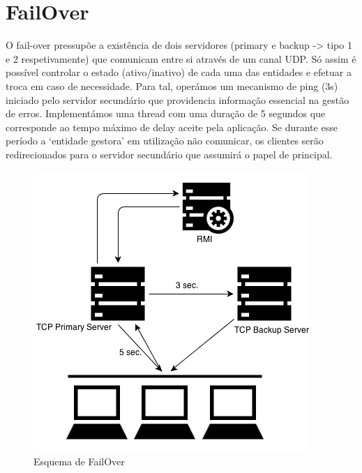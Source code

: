 \documentclass[12pt]{article} %
\begin{document}
\pagebreak

\section{FailOver}
\label{sec:failover}
O fail-over pressupõe a existência de dois servidores (primary e backup -> tipo 1 e 2 respetivamente) que comunicam entre si através de um canal UDP. Só assim é possível controlar o estado (ativo/inativo) de cada uma das entidades e efetuar a troca em caso de necessidade. Para tal, operámos um mecanismo de ping (3s) iniciado pelo servidor secundário que providencia informação essencial na gestão de erros. 
Implementámos uma thread com uma duração de 5 segundos que corresponde ao tempo máximo de delay aceite pela aplicação. Se durante esse período a ‘entidade gestora’ em utilização não comunicar, os clientes serão redirecionados para o servidor secundário que assumirá o papel de principal.

\begin{figure}[!ht]
	\centering
		\includegraphics[scale=0.6]{failover.png}
	\caption{Esquema de FailOver}
	\label{fig:Pictures_failover}
\end{figure}

\pagebreak
\end{document}
